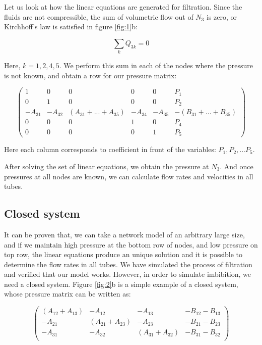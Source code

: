 \documentclass[
	12pt
] {article}
\begin{document}
	Let us look at how the linear equations are generated for filtration. Since the fluids are not compressible, the sum of volumetric flow out of $N_3$ is zero, or Kirchhoff's law is satisfied in figure \ref{fig:1}b:
	
	\begin{equation} \label{eq:sum-flow-node-zero}
		\sum_{k} Q_{3k} = 0
	\end{equation}
	
	Here, $k = {1, 2, 4, 5}$. We perform this sum in each of the nodes where the pressure is not known, and obtain a row for our pressure matrix:
	
	\begin{equation} \label{eq:matrix-open-sys-5-nodes}
		\begin{pmatrix}
			1 & 0 & 0 & 0 & 0 & P_{1}\\
			0 & 1 & 0 & 0 & 0 & P_{2}\\
			-A_{31} & -A_{32} & (A_{31} + ... + A_{35}) & -A_{34} & -A_{35} & -(B_{31} + ... + B_{35})\\
			0 & 0 & 0 & 1 & 0 & P_{4}\\
			0 & 0 & 0 & 0 & 1 & P_{5}
		\end{pmatrix}
	\end{equation}
	
	Here each column corresponds to coefficient in front of the variables: $P_1, P_2, ... P_5$.
	
	After solving the set of linear equations, we obtain the pressure at $N_3$. And once pressures at all nodes are known, we can calculate flow rates and velocities in all tubes.
	
\subsection{Closed system}	
	It can be proven that, we can take a network model of an arbitrary large size, and if we maintain high pressure at the bottom row of nodes, and low pressure on top row, the linear equations produce an unique solution and it is possible to determine the flow rates in all tubes. We have simulated the process of filtration and verified that our model works. However, in order to simulate imbibition, we need a closed system. Figure \ref{fig:2}b is a simple example of a closed system, whose pressure matrix can be written as:
	
	\begin{equation}
		\begin{pmatrix}
			(A_{12} + A_{13}) & -A_{12} & -A_{13} & -B_{12} - B_{13} \\
			-A_{21} & (A_{21} + A_{23}) & -A_{23} & -B_{21} - B_{23} \\
			-A_{31} & -A_{32} & (A_{31} + A_{32}) & -B_{31} - B_{32} \\
		\end{pmatrix}
	\end{equation}
	
\end{document}
